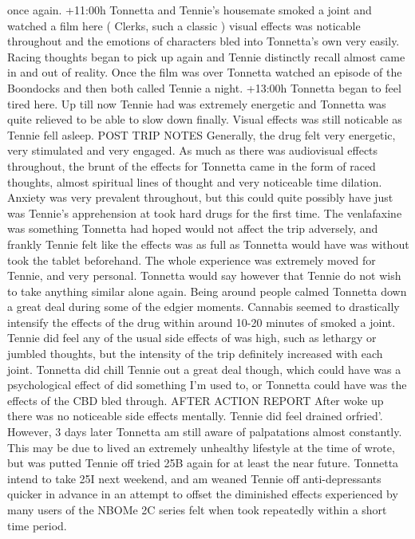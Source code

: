 \documentclass[12pt]{book}
\begin{document}
once again. +11:00h Tonnetta and Tennie's housemate smoked a joint and watched a film here ( Clerks, such a classic ) visual effects was noticable throughout and the emotions of characters bled into Tonnetta's own very easily. Racing thoughts began to pick up again and Tennie distinctly recall almost came in and out of reality. Once the film was over Tonnetta watched an episode of the Boondocks and then both called Tennie a night. +13:00h Tonnetta began to feel tired here. Up till now Tennie had was extremely energetic and Tonnetta was quite relieved to be able to slow down finally. Visual effects was still noticable as Tennie fell asleep. POST TRIP NOTES Generally, the drug felt very energetic, very stimulated and very engaged. As much as there was audiovisual effects throughout, the brunt of the effects for Tonnetta came in the form of raced thoughts, almost spiritual lines of thought and very noticeable time dilation. Anxiety was very prevalent throughout, but this could quite possibly have just was Tennie's apprehension at took hard drugs for the first time. The venlafaxine was something Tonnetta had hoped would not affect the trip adversely, and frankly Tennie felt like the effects was as full as Tonnetta would have was without took the tablet beforehand. The whole experience was extremely moved for Tennie, and very personal. Tonnetta would say however that Tennie do not wish to take anything similar alone again. Being around people calmed Tonnetta down a great deal during some of the edgier moments. Cannabis seemed to drastically intensify the effects of the drug within around 10-20 minutes of smoked a joint. Tennie did feel any of the usual side effects of was high, such as lethargy or jumbled thoughts, but the intensity of the trip definitely increased with each joint. Tonnetta did chill Tennie out a great deal though, which could have was a psychological effect of did something I'm used to, or Tonnetta could have was the effects of the CBD bled through. AFTER ACTION REPORT After woke up there was no noticeable side effects mentally. Tennie did feel drained orfried'. However, 3 days later Tonnetta am still aware of palpatations almost constantly. This may be due to lived an extremely unhealthy lifestyle at the time of wrote, but was putted Tennie off tried 25B again for at least the near future. Tonnetta intend to take 25I next weekend, and am weaned Tennie off anti-depressants quicker in advance in an attempt to offset the diminished effects experienced by many users of the NBOMe 2C series felt when took repeatedly within a short time period.
\end{document}
